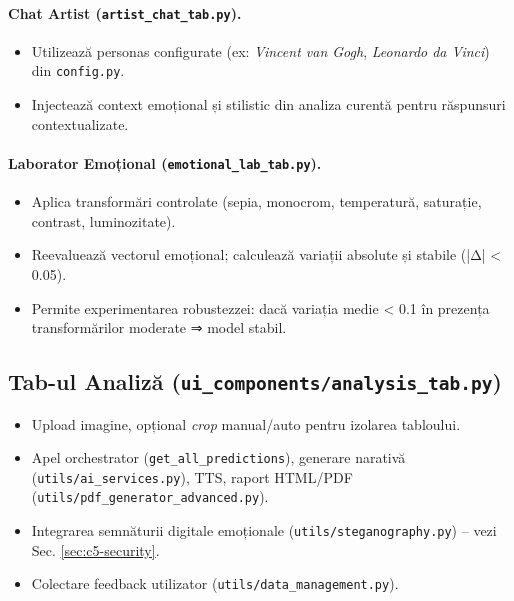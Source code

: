 \paragraph{Chat Artist (\texttt{artist\_chat\_tab.py}).}
\begin{itemize}
  \item Utilizează personas configurate (ex: \emph{Vincent van Gogh}, \emph{Leonardo da Vinci}) din \texttt{config.py}.
  \item Injectează context emoțional și stilistic din analiza curentă pentru răspunsuri contextualizate.
\end{itemize}

\paragraph{Laborator Emoțional (\texttt{emotional\_lab\_tab.py}).}
\begin{itemize}
  \item Aplica transformări controlate (sepia, monocrom, temperatură, saturație, contrast, luminozitate).
  \item Reevaluează vectorul emoțional; calculează variații absolute și stabile (|Δ| < 0.05).
  \item Permite experimentarea robustezzei: dacă variația medie < 0.1 în prezența transformărilor moderate ⇒ model stabil.
\end{itemize}

\subsection{Tab-ul Analiză (\texttt{ui\_components/analysis\_tab.py})}
\begin{itemize}
  \item Upload imagine, opțional \emph{crop} manual/auto pentru izolarea tabloului.
  \item Apel orchestrator (\texttt{get\_all\_predictions}), generare narativă (\texttt{utils/ai\_services.py}), TTS, raport HTML/PDF (\texttt{utils/pdf\_generator\_advanced.py}).
  \item Integrarea semnăturii digitale emoționale (\texttt{utils/steganography.py}) -- vezi Sec. \ref{sec:c5-security}.
  \item Colectare feedback utilizator (\texttt{utils/data\_management.py}).
\end{itemize}

